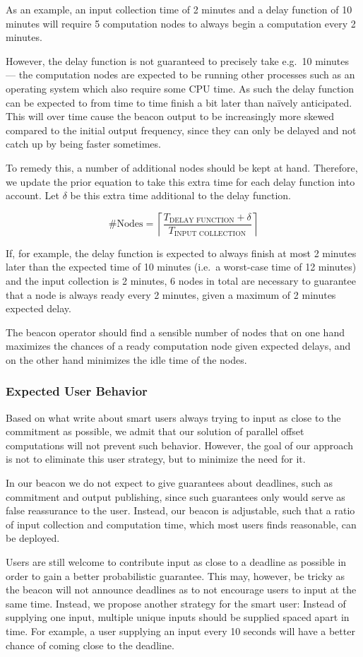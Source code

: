 As an example, an input collection time of 2 minutes and a delay function of 10 minutes will require 5 computation nodes to always begin a computation every 2 minutes.

However, the delay function is not guaranteed to precisely take e.g.\ 10 minutes --- the computation nodes are expected to be running other processes such as an operating system which also require some CPU time.
As such the delay function can be expected to from time to time finish a bit later than naïvely anticipated. This will over time cause the beacon output to be increasingly more skewed compared to the initial output frequency, since they can only be delayed and not catch up by being faster sometimes.

To remedy this, a number of additional nodes should be kept at hand.
Therefore, we update the prior equation to take this extra time for each delay function into account. Let $\delta$ be this extra time additional to the delay function.

\begin{equation*}
    \#\text{Nodes} = \left\lceil\frac{T_\text{DELAY FUNCTION}+\delta}{T_\text{INPUT COLLECTION}}\right\rceil
\end{equation*}

If, for example, the delay function is expected to always finish at most 2 minutes later than the expected time of 10 minutes (i.e.\ a worst-case time of 12 minutes) and the input collection is 2 minutes, 6 nodes in total are necessary to guarantee that a node is always ready every 2 minutes, given a maximum of 2 minutes expected delay.

The beacon operator should find a sensible number of nodes that on one hand maximizes the chances of a ready computation node given expected delays, and on the other hand minimizes the idle time of the nodes.

\subsubsection{Expected User Behavior}
Based on what \citet{randomzoo} write about smart users always trying to input as close to the commitment as possible, we admit that our solution of parallel offset computations will not prevent such behavior.
However, the goal of our approach is not to eliminate this user strategy, but to minimize the need for it.

In our beacon we do not expect to give guarantees about deadlines, such as commitment and output publishing, since such guarantees only would serve as false reassurance to the user.
Instead, our beacon is adjustable, such that a ratio of input collection and computation time, which most users finds reasonable, can be deployed.

Users are still welcome to contribute input as close to a deadline as possible in order to gain a better probabilistic guarantee. This may, however, be tricky as the beacon will not announce deadlines as to not encourage users to input at the same time. Instead, we propose another strategy for the smart user: Instead of supplying one input, multiple unique inputs should be supplied spaced apart in time. For example, a user supplying an input every 10 seconds will have a better chance of coming close to the deadline.
